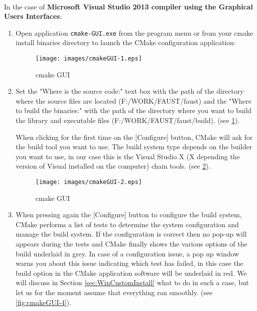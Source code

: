 \paragraph{}In the case of \textbf{Microsoft Visual Studio 2013 compiler using the Graphical Users Interfaces}:
\begin{enumerate}
\item Open application \texttt{cmake-GUI.exe} from the program menu or from your cmake install binaries directory  to launch the CMake configuration application:

\begin{figure}[!h] %
\centering
\texttt{[image: images/cmakeGUI-1.eps]}
\caption{cmake GUI}
\label{fig:cmakeGUI-1}
\end{figure}


\item Set the "Where is the source code:" text box with the path of the directory where the source files are located (F:/WORK/FAUST/faust) and the "Where to build the binaries:" with the path of the directory where you want to build the library and executable files (F:/WORK/FAUST/faust/build). (see \ref{fig:cmakeGUI-1}).

When clicking for the first time on the [Configure] button, CMake will ask for the build tool you want to use. The build system type depends on the builder you want to use, in our case this is the Visual Studio X (X depending the version of Visual installed on the computer) chain tools. (see \ref{fig:cmakeGUI-2}).


\begin{figure}[!h]
\centering
\texttt{[image: images/cmakeGUI-2.eps]}
\caption{cmake GUI}
\label{fig:cmakeGUI-2}
\end{figure}

\item When pressing again the [Configure] button to configure the build system, CMake performs a list of tests to determine the system configuration and manage the build system. If the configuration is correct then no pop-up will appears during the tests and CMake finally shows the various options of the build underlaid in grey. In case of a configuration issue, a pop up window warns you about this issue indicating which test has failed, in this case the build option in the CMake application software will be underlaid in red. We will discuss in Section \ref{sec:WinCustomInstall} what to do in such a case, but let us for the moment assume that everything ran smoothly.
(see \ref{fig:cmakeGUI-4}).


\end{enumerate}

